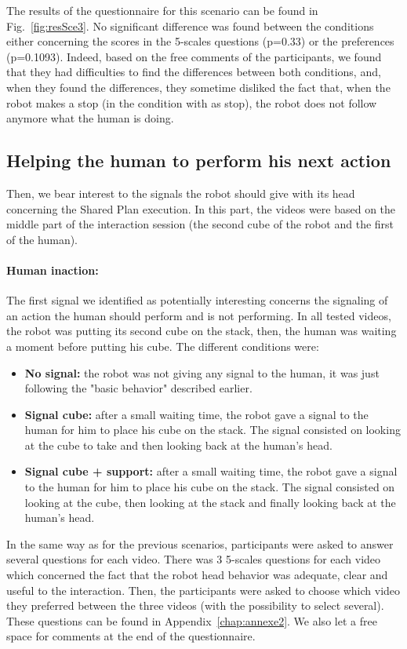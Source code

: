 \documentclass[english,a4paper,11pt,twoside]{StyleThese}
\begin{document}
The results of the questionnaire for this scenario can be found in Fig.~\ref{fig:resSce3}. No significant difference was found between the conditions either concerning the scores in the 5-scales questions (p=0.33) or the preferences (p=0.1093). Indeed, based on the free comments of the participants, we found that they had difficulties to find the differences between both conditions, and, when they found the differences, they sometime disliked the fact that, when the robot makes a stop (in the condition with as stop), the robot does not follow anymore what the human is doing.


\subsection{Helping the human to perform his next action}

Then, we bear interest to the signals the robot should give with its head concerning the Shared Plan execution. In this part, the videos were based on the middle part of the interaction session (the second cube of the robot and the first of the human).

\paragraph{Human inaction:} The first signal we identified as potentially interesting concerns the signaling of an action the human should perform and is not performing. In all tested videos, the robot was putting its second cube on the stack, then, the human was waiting a moment before putting his cube. The different conditions were:
\begin{itemize}
\item \textbf{No signal:} the robot was not giving any signal to the human, it was just following the "basic behavior" described earlier.
\item \textbf{Signal cube:} after a small waiting time, the robot gave a signal to the human for him to place his cube on the stack. The signal consisted on looking at the cube to take and then looking back at the human's head.
\item \textbf{Signal cube + support:} after a small waiting time, the robot gave a signal to the human for him to place his cube on the stack. The signal consisted on looking at the cube, then looking at the stack and finally looking back at the human's head.
\end{itemize}
In the same way as for the previous scenarios, participants were asked to answer several questions for each video. There was 3 5-scales questions for each video which concerned the fact that the robot head behavior was adequate, clear and useful to the interaction. Then, the participants were asked to choose which video they preferred between the three videos (with the possibility to select several). These questions can be found in Appendix~\ref{chap:annexe2}. We also let a free space for comments at the end of the questionnaire.
\end{document}
